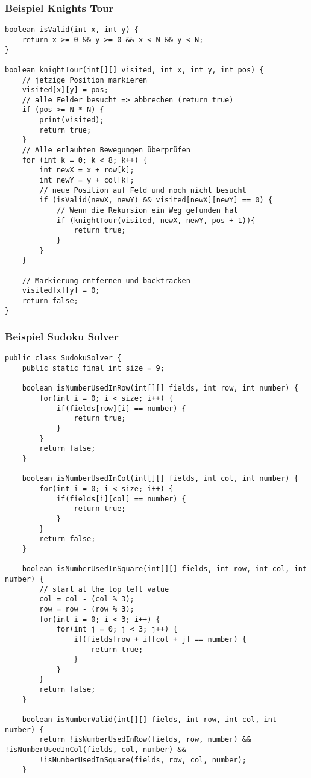 \begin{multicols*}{4}
		\subsubsection{Beispiel Knights Tour}
			\begin{lstlisting}
boolean isValid(int x, int y) {
	return x >= 0 && y >= 0 && x < N && y < N;
}

boolean knightTour(int[][] visited, int x, int y, int pos) {
	// jetzige Position markieren
	visited[x][y] = pos;
	// alle Felder besucht => abbrechen (return true)
	if (pos >= N * N) {
		print(visited);
		return true;
	}
	// Alle erlaubten Bewegungen überprüfen
	for (int k = 0; k < 8; k++) {
		int newX = x + row[k];
		int newY = y + col[k];
		// neue Position auf Feld und noch nicht besucht
		if (isValid(newX, newY) && visited[newX][newY] == 0) {
			// Wenn die Rekursion ein Weg gefunden hat
			if (knightTour(visited, newX, newY, pos + 1)){
				return true;
			}
		}
	}
	
	// Markierung entfernen und backtracken
	visited[x][y] = 0;
	return false;
}
			\end{lstlisting}
		
		\subsubsection{Beispiel Sudoku Solver}
			\begin{lstlisting}
public class SudokuSolver { 
	public static final int size = 9; 
	
	boolean isNumberUsedInRow(int[][] fields, int row, int number) { 
		for(int i = 0; i < size; i++) { 
			if(fields[row][i] == number) { 
				return true; 
			} 
		} 
		return false; 
	} 
	
	boolean isNumberUsedInCol(int[][] fields, int col, int number) { 
		for(int i = 0; i < size; i++) { 
			if(fields[i][col] == number) { 
				return true; 
			} 
		} 
		return false; 
	} 
	
	boolean isNumberUsedInSquare(int[][] fields, int row, int col, int number) { 
		// start at the top left value 
		col = col - (col % 3); 
		row = row - (row % 3); 
		for(int i = 0; i < 3; i++) { 
			for(int j = 0; j < 3; j++) { 
				if(fields[row + i][col + j] == number) { 
					return true; 
				} 
			} 
		} 
		return false; 
	} 
	
	boolean isNumberValid(int[][] fields, int row, int col, int number) { 
		return !isNumberUsedInRow(fields, row, number) && !isNumberUsedInCol(fields, col, number) && 
		!isNumberUsedInSquare(fields, row, col, number); 
	} 
	

\end{lstlisting}
\end{multicols*}
